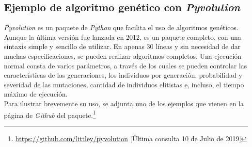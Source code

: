 		\subsection{Ejemplo de algoritmo gen\'etico con \textit{Pyvolution}}
		
		\textit{Pyvolution} es un paquete de \textit{Python} que facilita el uso de algoritmos gen\'eticos. Aunque la \'ultima versi\'on fue lanzada en 2012, es un paquete completo, con una sintaxis simple y sencillo de utilizar. En apenas 30 l\'ineas y sin necesidad de dar muchas especificaciones, se pueden realizar algoritmos completos. Una ejecuci\'on normal consta de varios par\'ametros, a trav\'es de los cuales se pueden controlar las caracter\'isticas de las generaciones, los individuos por generaci\'on, probabilidad y severidad de las mutaciones, cantidad de individuos elitistas e, incluso, el tiempo m\'aximo de ejecuci\'on.\\
		
		Para ilustrar brevemente su uso, se adjunta uno de los ejemplos que vienen en la p\'agina de \textit{Github} del paquete.\footnote{\url{https://github.com/littley/pyvolution} [\'Ultima consulta 10 de Julio de 2019]}\\
		

